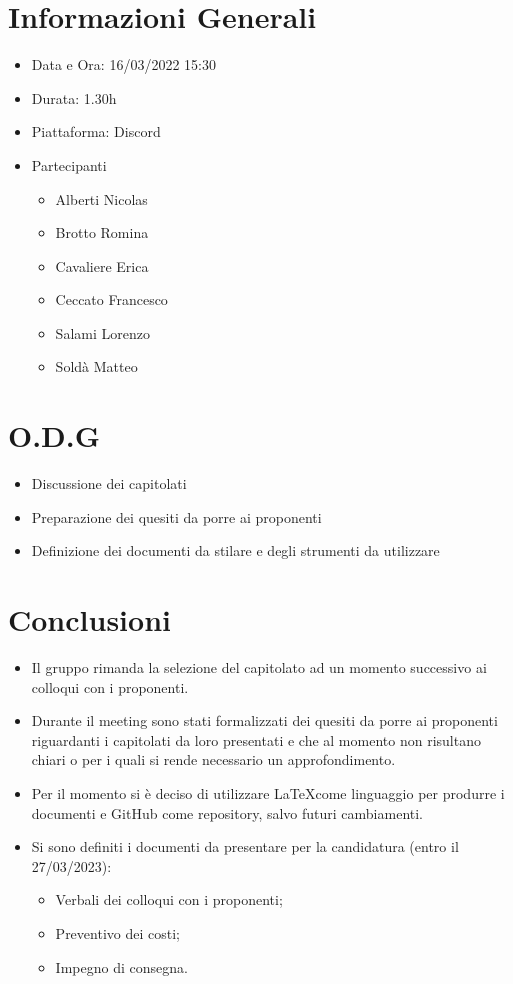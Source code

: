 \documentclass[a4paper, 12pt]{article}
\begin{document}
\makefrontpage

\section*{Informazioni Generali}
\begin{itemize}
    \item Data e Ora: 16/03/2022 15:30
    \item Durata: 1.30h
    \item Piattaforma: Discord
    \item Partecipanti
    \begin{itemize}
        \item Alberti Nicolas
        \item Brotto Romina
        \item Cavaliere Erica
        \item Ceccato Francesco
        \item Salami Lorenzo
        \item Soldà Matteo
    \end{itemize}
\end{itemize}

\section*{O.D.G}
\begin{itemize}
    \item Discussione dei capitolati
    \item Preparazione dei quesiti da porre ai proponenti
    \item Definizione dei documenti da stilare e degli strumenti da utilizzare
\end{itemize}
\section*{Conclusioni}
\begin{itemize}
    \item Il gruppo rimanda la selezione del capitolato ad un momento successivo ai colloqui con i proponenti.
    \item Durante il meeting sono stati formalizzati dei quesiti da porre ai proponenti riguardanti i capitolati da loro presentati e che al momento non risultano chiari o per i quali si rende necessario un approfondimento. 
    \item Per il momento si è deciso di utilizzare \LaTeX come linguaggio per produrre i documenti e GitHub come repository, salvo futuri cambiamenti.
    \item Si sono definiti i documenti da presentare per la candidatura (entro il 27/03/2023):
    \begin{itemize}
        \item Verbali dei colloqui con i proponenti;
        \item Preventivo dei costi;
        \item Impegno di consegna.
    \end{itemize} 
\end{itemize}
\end{document}
